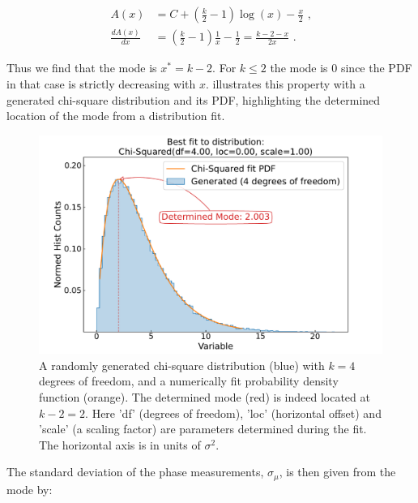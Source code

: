 \begin{equation}
	\begin{aligned}
        A(x)              &= C + \left( \frac{k}{2} - 1 \right) \log(x) - \frac{x}{2} \text{ ,} \\
        \frac{d A(x)}{dx} &= \left( \frac{k}{2} - 1 \right) \frac{1}{x} - \frac{1}{2} = \frac{k - 2 - x}{2x} \text{ .}
	\end{aligned}	
    \label{equation:chi2_pdf_mode_proof}
\end{equation}

Thus we find that the mode is \(x^{*} = k - 2\).
For \(k \leq 2\) the mode is 0 since the PDF in that case is strictly decreasing with \(x\).
 illustrates this property with a generated chi-square distribution and its PDF, highlighting the determined location of the mode from a distribution fit.
\newline

\begin{figure}[!htb]
    \centering
    \includegraphics*[width=\textwidth]{Figures/Other_Studies/phase_chisquare_demo_fit.pdf}
    \caption{A randomly generated chi-square distribution (\textcolor{mplblue}{blue}) with \(k = 4\) degrees of freedom, and a numerically fit probability density function (\textcolor{mplorange}{orange}). The determined mode (\textcolor{mplred}{red}) is indeed located at \(k - 2 = 2\). Here 'df' (degrees of freedom), 'loc' (horizontal offset) and 'scale' (a scaling factor) are parameters determined during the fit. The horizontal axis is in units of \(\sigma^2\).}
    \label{figure:chisquare_demo_fit}
\end{figure}

The standard deviation of the phase measurements, \(\sigma_{\mu}\), is then given from the mode by:

